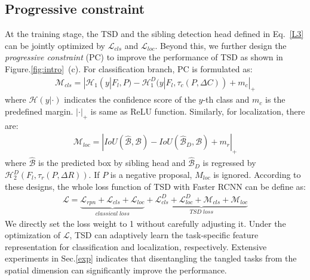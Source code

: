 \documentclass[10pt,twocolumn,letterpaper]{article}
\def \algname{TSD}
\def \loss{PC}
\begin{document}
\subsection{Progressive constraint}\label{L2}
At the training stage, the \algname{} and the sibling detection head defined in Eq.~\ref{L3} can be jointly optimized by $\mathcal{L}_{cls}$ and $\mathcal{L}_{loc}$.
Beyond this, we further design the \emph{progressive constraint} (\loss{}) to improve the performance of \algname{} as shown in Figure.\ref{fig:intro}~(c).
For classification branch, \loss{} is formulated as:
\begin{equation}
\begin{split}
\mathcal{M}_{cls} \!=\! |  \mathcal{H}_1(y | F_l, P) \!-\! \mathcal{H}^D_1(y| F_l, \tau_c(P,\Delta C)) \!+\! m_c |_+
 \end{split}
\end{equation}
where $\mathcal{H}(y|\cdot)$ indicates the confidence score of the $y$-th class and $m_c$ is the predefined margin. $|\cdot|_+$ is same as ReLU function.
Similarly, for localization, there are:
\begin{equation}
\begin{split}
\mathcal{M}_{loc} = |  IoU(\hat{\mathcal{B}}, \mathcal{B}) - IoU(\hat{\mathcal{B}}_D, \mathcal{B}) + m_r |_+
 \end{split}
\end{equation}
where $\hat{\mathcal{B}}$ is the predicted box by sibling head and $\hat{\mathcal{B}}_D$ is regressed by $\mathcal{H}^D_2(F_l, \tau_r(P, \Delta R))$.
If $P$ is a negative proposal, $M_{loc}$ is ignored.
According to these designs, the whole loss function of \algname{} with Faster RCNN can be define as:
\begin{equation}
\begin{split}
\mathcal{L}\!=\! \underbrace{\mathcal{L}_{rpn} \!+\! \mathcal{L}_{cls} \!+\! \mathcal{L}_{loc}  }_{classical\; loss}
+  \underbrace{  \mathcal{L}^D_{cls} \!+\! \mathcal{L}^D_{loc} \!+\! \mathcal{M}_{cls} \!+\! \mathcal{M}_{loc} }_{\algname{}\; loss}
 \end{split}
\end{equation}
We directly set the loss weight to 1 without carefully adjusting it.
Under the optimization of $\mathcal{L}$, \algname{} can adaptively learn the task-specific feature representation for classification and localization, respectively.
Extensive experiments in Sec.\ref{exp} indicates that disentangling the tangled tasks from the spatial dimension can significantly improve the performance.
\end{document}
